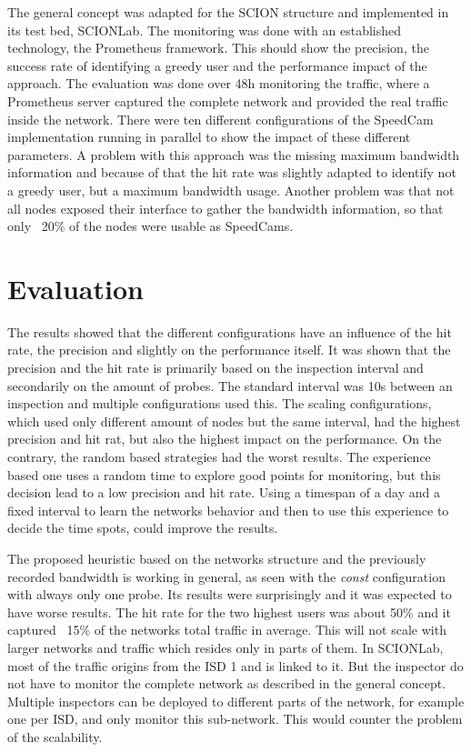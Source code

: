 \documentclass[thesis.tex]{subfiles}
\begin{document}
The general concept was adapted for the SCION structure and implemented in its test bed, SCIONLab. The monitoring was done with an established technology, the Prometheus framework. This should show the precision, the success rate of identifying a greedy user and the performance impact of the approach. The evaluation was done over 48h monitoring the traffic, where a Prometheus server captured the complete network and provided the real traffic inside the network. There were ten different configurations of the SpeedCam implementation running in parallel to show the impact of these different parameters. A problem with this approach was the missing maximum bandwidth information and because of that the hit rate was slightly adapted to identify not a greedy user, but a maximum bandwidth usage. Another problem was that not all nodes exposed their interface to gather the bandwidth information, so that only ~20\% of the nodes were usable as SpeedCams.

\section{Evaluation}
The results showed that the different configurations have an influence of the hit rate, the precision and slightly on the performance itself. It was shown that the precision and the hit rate is primarily based on the inspection interval and secondarily on the amount of probes. The standard interval was 10s between an inspection and multiple configurations used this. The scaling configurations, which used only different amount of nodes but the same interval, had the highest precision and hit rat, but also the highest impact on the performance. On the contrary, the random based strategies had the worst results. The experience based one uses a random time to explore good points for monitoring, but this decision lead to a low precision and hit rate. Using a timespan of a day and a fixed interval to learn the networks behavior and then to use this experience to decide the time spots, could improve the results.

The proposed heuristic based on the networks structure and the previously recorded bandwidth is working in general, as seen with the \textit{const} configuration with always only one probe. Its results were surprisingly and it was expected to have worse results. The hit rate for the two highest users was about 50\% and it captured ~15\% of the networks total traffic in average. This will not scale with larger networks and traffic which resides only in parts of them. In SCIONLab, most of the traffic origins from the ISD 1 and is linked to it. But the inspector do not have to monitor the complete network as described in the general concept. Multiple inspectors can be deployed to different parts of the network, for example one per ISD, and only monitor this sub-network. This would counter the problem of the scalability.
\end{document}
